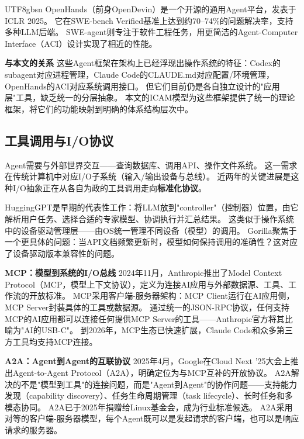 \documentclass[11pt,a4paper]{article}
\begin{document}
\begin{CJK*}{UTF8}{gbsn}
OpenHands\cite{openhands_paper_2025}（前身OpenDevin）是一个开源的通用Agent平台，发表于ICLR 2025。
它在SWE-bench Verified基准上达到约70--74\%的问题解决率\cite{swebench2023}，支持多种LLM后端。
SWE-agent\cite{sweagent2024}则专注于软件工程任务，用更简洁的Agent-Computer Interface（ACI）设计实现了相近的性能。

\textbf{与本文的关系}
这些Agent框架在架构上已经浮现出操作系统的特征：Codex的subagent对应进程管理，Claude Code的CLAUDE.md对应配置/环境管理，OpenHands的ACI对应系统调用接口。
但它们目前仍是各自独立设计的"应用层"工具，缺乏统一的分层抽象。
本文的ICAM模型为这些框架提供了统一的理论框架，将它们的功能映射到明确的体系结构层次中。

\subsection{工具调用与I/O协议}
\label{sec:related-io}

Agent需要与外部世界交互——查询数据库、调用API、操作文件系统。
这一需求在传统计算机中对应I/O子系统（输入/输出设备与总线）。
近两年的关键进展是这种I/O抽象正在从各自为政的工具调用走向\textbf{标准化协议}。

HuggingGPT\cite{hugginggpt2023}是早期的代表性工作：将LLM放到"controller"（控制器）位置，由它解析用户任务、选择合适的专家模型、协调执行并汇总结果。
这类似于操作系统中的设备驱动管理层——由OS统一管理不同设备（模型）的调用。
Gorilla\cite{patil2024gorilla}聚焦于一个更具体的问题：当API文档频繁更新时，模型如何保持调用的准确性？这对应了设备驱动版本兼容性的问题。

\textbf{MCP：模型到系统的I/O总线}
2024年11月，Anthropic推出了Model Context Protocol（MCP，模型上下文协议）\cite{mcp_intro_2026}，定义为连接AI应用与外部数据源、工具、工作流的开放标准。
MCP采用客户端-服务器架构：MCP Client运行在AI应用侧，MCP Server封装具体的工具或数据源。
通过统一的JSON-RPC协议，任何支持MCP的AI应用都可以连接任何提供MCP Server的工具——Anthropic官方将其比喻为"AI的USB-C"。
到2026年，MCP生态已快速扩展，Claude Code\cite{anthropic_claudecode_mcp_2026}和众多第三方工具均支持MCP连接。

\textbf{A2A：Agent到Agent的互联协议}
2025年4月，Google在Cloud Next '25大会上推出Agent-to-Agent Protocol（A2A）\cite{google_a2a_2025}，明确定位为与MCP互补的开放协议。
A2A解决的不是"模型到工具"的连接问题，而是"Agent到Agent"的协作问题——支持能力发现（capability discovery）、任务生命周期管理（task lifecycle）、长时任务和多模态协同。
A2A已于2025年捐赠给Linux基金会，成为行业标准候选。
A2A采用对等的客户端-服务器模型，每个Agent既可以是发起请求的客户端，也可以是响应请求的服务器。


\end{CJK*}
\end{document}
